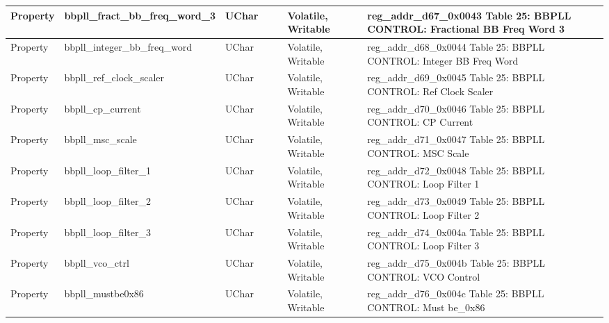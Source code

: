 \documentclass{article}
\begin{document}
\begin{scriptsize}
\begin{longtable}{|p{2cm}|p{5cm}|p{1cm}|p{2cm}|p{2cm}|p{1.75cm}|p{1.5cm}|p{5.1cm}|}
  \hline
  Property & bbpll\_fract\_bb\_freq\_word\_3                          & UChar &                  &                  & Volatile,  Writable &         & reg\_addr\_d67\_0x0043  Table 25: BBPLL CONTROL: Fractional BB Freq Word 3 \\
  \hline
  Property & bbpll\_integer\_bb\_freq\_word                           & UChar &                  &                  & Volatile,  Writable &         & reg\_addr\_d68\_0x0044  Table 25: BBPLL CONTROL: Integer BB Freq Word \\
  \hline
  Property & bbpll\_ref\_clock\_scaler                                & UChar &                  &                  & Volatile,  Writable &         & reg\_addr\_d69\_0x0045  Table 25: BBPLL CONTROL: Ref Clock Scaler \\
  \hline
  Property & bbpll\_cp\_current                                       & UChar &                  &                  & Volatile,  Writable &         & reg\_addr\_d70\_0x0046  Table 25: BBPLL CONTROL: CP Current \\
  \hline
  Property & bbpll\_msc\_scale                                        & UChar &                  &                  & Volatile,  Writable &         & reg\_addr\_d71\_0x0047  Table 25: BBPLL CONTROL: MSC Scale \\
  \hline
  Property & bbpll\_loop\_filter\_1                                   & UChar &                  &                  & Volatile,  Writable &         & reg\_addr\_d72\_0x0048  Table 25: BBPLL CONTROL: Loop Filter 1 \\
  \hline
  Property & bbpll\_loop\_filter\_2                                   & UChar &                  &                  & Volatile,  Writable &         & reg\_addr\_d73\_0x0049  Table 25: BBPLL CONTROL: Loop Filter 2 \\
  \hline
  Property & bbpll\_loop\_filter\_3                                   & UChar &                  &                  & Volatile,  Writable &         & reg\_addr\_d74\_0x004a  Table 25: BBPLL CONTROL: Loop Filter 3 \\
  \hline
  Property & bbpll\_vco\_ctrl                                         & UChar &                  &                  & Volatile,  Writable &         & reg\_addr\_d75\_0x004b  Table 25: BBPLL CONTROL: VCO Control \\
  \hline
  Property & bbpll\_mustbe0x86                                        & UChar &                  &                  & Volatile,  Writable &         & reg\_addr\_d76\_0x004c  Table 25: BBPLL CONTROL: Must be\_0x86 \\

\end{longtable}
\end{scriptsize}
\end{document}
